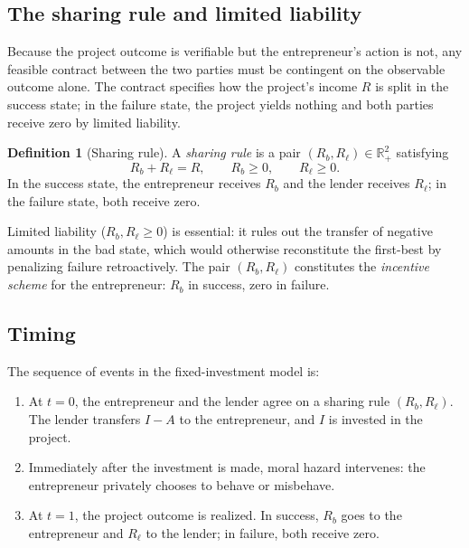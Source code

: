 \documentclass[11pt,a4paper,oneside]{book}
\def\R{\mathbb{R}}
\def\geq{\geqslant}
\theoremstyle{plain}
\theoremstyle{definition}
\newtheorem{definition}[theorem]{Definition}
\theoremstyle{remark}
\numberwithin{equation}{chapter}
\begin{document}
\subsection{The sharing rule and limited liability}

Because the project outcome is verifiable but the entrepreneur's action is not, any feasible contract between the two parties must be contingent on the observable outcome alone.
The contract specifies how the project's income $R$ is split in the success state; in the failure state, the project yields nothing and both parties receive zero by limited liability.

\begin{definition}[Sharing rule]\label{def:sharing-rule}
A \emph{sharing rule} is a pair $(R_b, R_\ell) \in \R_+^2$ satisfying
\begin{equation}\label{eq:HT-sharing}
  R_b + R_\ell = R, \qquad R_b \geq 0, \qquad R_\ell \geq 0.
\end{equation}
In the success state, the entrepreneur receives $R_b$ and the lender receives $R_\ell$; in the failure state, both receive zero.
\end{definition}

Limited liability ($R_b, R_\ell \geq 0$) is essential: it rules out the transfer of negative amounts in the bad state, which would otherwise reconstitute the first-best by penalizing failure retroactively.
The pair $(R_b, R_\ell)$ constitutes the \emph{incentive scheme} for the entrepreneur: $R_b$ in success, zero in failure.

\subsection{Timing}

The sequence of events in the fixed-investment model is:
\begin{enumerate}
  \item At $t=0$, the entrepreneur and the lender agree on a sharing rule $(R_b, R_\ell)$.
  The lender transfers $I - A$ to the entrepreneur, and $I$ is invested in the project.
  \item Immediately after the investment is made, moral hazard intervenes: the entrepreneur privately chooses to behave or misbehave.
  \item At $t=1$, the project outcome is realized.
  In success, $R_b$ goes to the entrepreneur and $R_\ell$ to the lender; in failure, both receive zero.
\end{enumerate}
\end{document}
